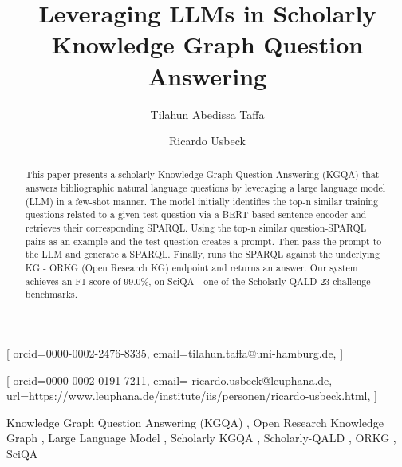 \documentclass[
]{ceurart}
\begin{document}


\title{Leveraging LLMs in Scholarly Knowledge Graph Question Answering}

\tnotemark[1]

\author[1]{Tilahun Abedissa Taffa}[%
orcid=0000-0002-2476-8335,
email=tilahun.taffa@uni-hamburg.de,
] 
\cormark[1]
\address[1]{Semantic Systems, Universität Hamburg, Vogt-Kölln-Straße 30, 22527 Hamburg, Germany}
\author[2]{Ricardo Usbeck}[%
orcid=0000-0002-0191-7211,
email= ricardo.usbeck@leuphana.de,
url=https://www.leuphana.de/institute/iis/personen/ricardo-usbeck.html,
]
\address[2]{Leuphana Universität Lüneburg, Universitätsallee 1, C 4.314, 21335 Lüneburg, Germany}


\begin{abstract}
  This paper presents a scholarly Knowledge Graph Question Answering (KGQA) that answers bibliographic natural language questions by leveraging a large language model (LLM) in a few-shot manner. The model initially identifies the top-n similar training questions related to a given test question via a BERT-based sentence encoder and retrieves their corresponding SPARQL. Using the top-n similar question-SPARQL pairs as an example and the test question creates a prompt. Then pass the prompt to the LLM and generate a SPARQL. Finally, runs the SPARQL against the underlying KG - ORKG (Open Research KG) endpoint and returns an answer. Our system achieves an F1 score of 99.0\%, on SciQA - one of the Scholarly-QALD-23 challenge benchmarks.
  
\end{abstract}

\begin{keywords}
  Knowledge Graph Question Answering (KGQA) \sep
  Open Research Knowledge Graph \sep
  Large Language Model \sep
  Scholarly KGQA \sep
  Scholarly-QALD \sep
  ORKG \sep
  SciQA
\end{keywords}

\maketitle
\end{document}
